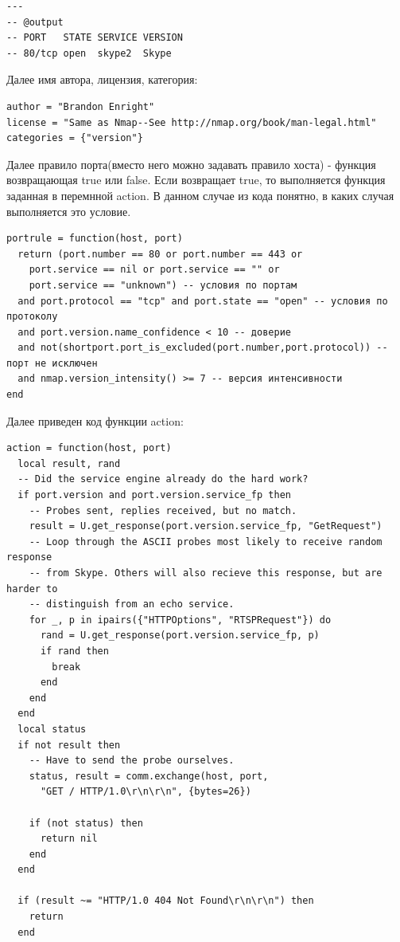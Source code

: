 \documentclass[11pt, a4paper]{article}		%
\begin{document}
\begin{itemize}
\begin{verbatim}
---
-- @output
-- PORT   STATE SERVICE VERSION
-- 80/tcp open  skype2  Skype
\end{verbatim}

Далее имя автора, лицензия, категория:

\begin{verbatim}
author = "Brandon Enright"
license = "Same as Nmap--See http://nmap.org/book/man-legal.html"
categories = {"version"}
\end{verbatim}

Далее правило порта(вместо него можно задавать правило хоста) - функция возвращающая true или false. Если возвращает true, то выполняется функция заданная в перемнной action. В данном случае из кода понятно, в каких случая выполняется это условие.
 
\begin{verbatim}
portrule = function(host, port)
  return (port.number == 80 or port.number == 443 or
    port.service == nil or port.service == "" or
    port.service == "unknown") -- условия по портам
  and port.protocol == "tcp" and port.state == "open" -- условия по протоколу
  and port.version.name_confidence < 10 -- доверие
  and not(shortport.port_is_excluded(port.number,port.protocol)) -- порт не исключен
  and nmap.version_intensity() >= 7 -- версия интенсивности
end
\end{verbatim}

Далее приведен код функции action:

\begin{verbatim}
action = function(host, port)
  local result, rand
  -- Did the service engine already do the hard work?
  if port.version and port.version.service_fp then
    -- Probes sent, replies received, but no match.
    result = U.get_response(port.version.service_fp, "GetRequest")
    -- Loop through the ASCII probes most likely to receive random response
    -- from Skype. Others will also recieve this response, but are harder to
    -- distinguish from an echo service.
    for _, p in ipairs({"HTTPOptions", "RTSPRequest"}) do
      rand = U.get_response(port.version.service_fp, p)
      if rand then
        break
      end
    end
  end
  local status
  if not result then
    -- Have to send the probe ourselves.
    status, result = comm.exchange(host, port,
      "GET / HTTP/1.0\r\n\r\n", {bytes=26})

    if (not status) then
      return nil
    end
  end

  if (result ~= "HTTP/1.0 404 Not Found\r\n\r\n") then
    return
  end


\end{verbatim}
\end{itemize}
\end{document}
